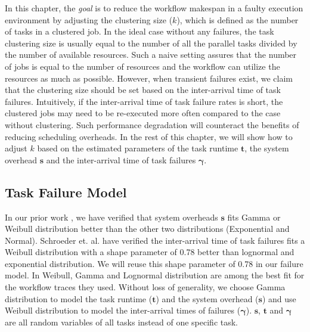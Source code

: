 In this chapter, the \emph{goal} is to reduce the workflow makespan in a faulty execution environment by adjusting the clustering size ($k$), which is defined as the number of tasks in a clustered job. In the ideal case without any failures, the task clustering size is usually equal to the number of all the parallel tasks divided by the number of available resources. Such a naive setting assures that the number of jobs is equal to the number of resources and the workflow can utilize the resources as much as possible. However, when transient failures exist, we claim that the clustering size should be set based on the inter-arrival time of task failures. Intuitively, if the inter-arrival time of task failure rates is short, the clustered jobs may need to be re-executed more often compared to the case without clustering. Such performance degradation will counteract the benefits of reducing scheduling overheads. In the rest of this chapter, we will show how to adjust $k$ based on the estimated parameters of the task runtime $\bm t$, the system overhead $\bm s$ and the inter-arrival time of task failures $\bm\gamma$. 

\subsection{Task Failure Model}




In our prior work \cite{Chen2011}, we have verified that system overheads $\bm s$ fits Gamma or Weibull distribution better than the other two distributions (Exponential and Normal). Schroeder et. al. \cite{Schroeder2006} have verified the inter-arrival time of task failures fits a Weibull distribution with a shape parameter of 0.78 better than lognormal and exponential distribution. We will reuse this shape parameter of 0.78 in our failure model. 
In \cite{Sun2003, Iosup2008} Weibull, Gamma and Lognormal distribution are among the best fit for the workflow traces they used.  Without loss of generality, we choose Gamma distribution to model the task runtime ($\bm t$) and the system overhead ($\bm s$) and use Weibull distribution to model the inter-arrival times of failures ($\bm\gamma$).  $\bm s$, $\bm t$ and $\bm \gamma$ are all random variables of all tasks instead of one specific task. 

